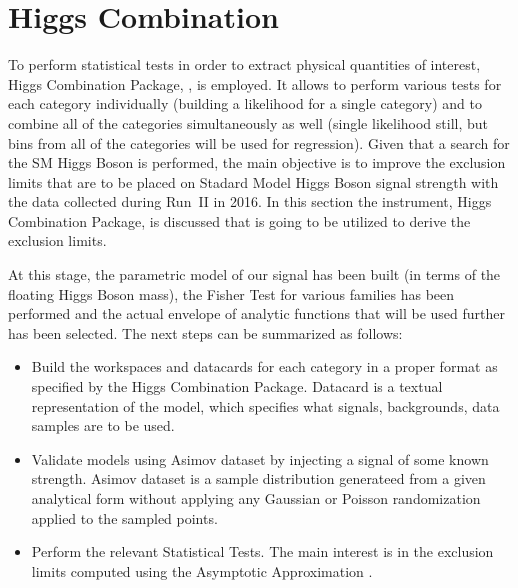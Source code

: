 \section{Higgs Combination} \label{section:higgs_combination}
To perform statistical tests in order to extract physical quantities of interest, Higgs Combination Package, \cite{CMSHiggsCombination}, is employed. It allows to perform various tests for each category individually (building a likelihood for a single category) and to combine all of the categories simultaneously as well (single likelihood still, but bins from all of the categories will be used for regression). Given that a search for the SM Higgs Boson is performed, the main objective is to improve the exclusion limits that are to be placed on Stadard Model Higgs Boson signal strength with the data collected during Run~II in 2016. In this section the instrument, Higgs Combination Package, is discussed that is going to be utilized to derive the exclusion limits.

At this stage, the parametric model of our signal has been built (in terms of the floating Higgs Boson mass), the Fisher Test for various families has been performed and the actual envelope of analytic functions that will be used further has been selected. The next steps can be summarized as follows:
\begin{itemize}
    \item Build the workspaces and datacards for each category in a proper format as specified by the Higgs Combination Package. Datacard is a textual representation of the model, which specifies what signals, backgrounds, data samples are to be used.
    \item Validate models using Asimov dataset by injecting a signal of some known strength. Asimov dataset is a sample distribution generateed from a given analytical form without applying any Gaussian or Poisson randomization applied to the sampled points.
    \item Perform the relevant Statistical Tests. The main interest is in the exclusion limits computed using the Asymptotic Approximation \cite{Asymptotic}.
\end{itemize}

